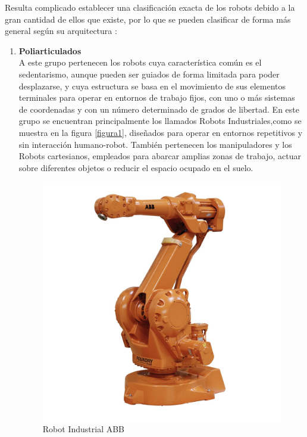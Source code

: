 Resulta complicado establecer una clasificación exacta de los robots debido a la gran cantidad de ellos que existe, por lo que se pueden clasificar de forma más general según su arquitectura \cite{ref6}: 

\begin{enumerate}

\item \textbf{Poliarticulados}\\ A este grupo pertenecen los robots cuya característica común es el sedentarismo, aunque pueden ser guiados de forma limitada para poder desplazarse, y cuya estructura se basa en el movimiento de sus elementos terminales para operar en entornos de trabajo fijos, con uno o más sistemas de coordenadas y con un número determinado de grados de libertad. En este grupo se encuentran principalmente los llamados Robots Industriales,como se muestra en la figura \eqref{figura1}, diseñados para operar en entornos repetitivos y sin interacción humano-robot. También pertenecen los manipuladores y los Robots cartesianos, empleados para abarcar amplias zonas de trabajo, actuar sobre diferentes objetos o reducir el espacio ocupado en el suelo.

\begin{figure}[H]
\centering
\includegraphics[scale=0.12]{imagenes/apartado_2/21_poliarticulado1_Robot_Industrial_ABB}
\caption{Robot Industrial ABB \cite{ref37}}
\label{figura21}
\end{figure}


\end{enumerate}
